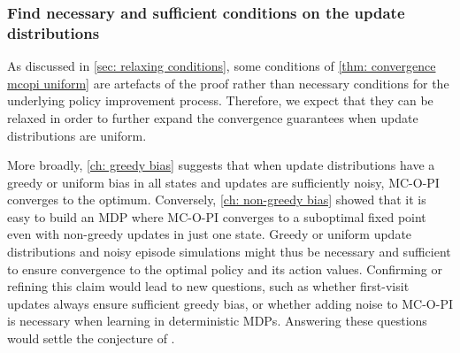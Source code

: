 





\subsubsection{Find necessary and sufficient conditions on the update distributions}
\vspace{-0.2cm}

As discussed in \autoref{sec: relaxing conditions}, 
some conditions of \autoref{thm: convergence mcopi uniform} are artefacts of the proof rather than necessary conditions for the underlying policy improvement process.
Therefore, we expect that they can be relaxed in order to further expand the convergence guarantees when update distributions are uniform.

\vspace{-0.1cm}

More broadly, \autoref{ch: greedy bias} suggests that when update distributions have a greedy or uniform bias in all states and updates are sufficiently noisy, MC-O-PI converges to the optimum.
Conversely, \autoref{ch: non-greedy bias} showed that it is easy to build an MDP where MC-O-PI converges to a suboptimal fixed point even with non-greedy updates in just one state.
Greedy or uniform update distributions and noisy episode simulations 
might thus be necessary and sufficient 
to ensure convergence to the optimal policy and its action values.
Confirming or refining this claim would lead to new questions, such as whether first-visit updates always ensure sufficient greedy bias,
or whether adding noise to MC-O-PI is necessary when learning in deterministic MDPs.
Answering these questions would settle the conjecture of \citet[p. 99]{Sutton2018ReinforcementIntroduction}.


